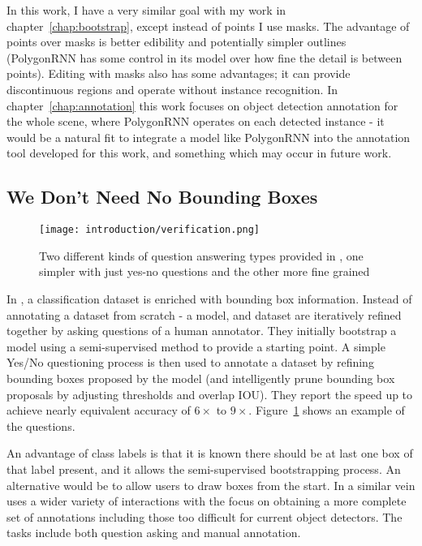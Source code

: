 In this work, I have a very similar goal with my work in chapter~\ref{chap:bootstrap}, except instead of points I use masks. The advantage of points over masks is better edibility and potentially simpler outlines (PolygonRNN has some control in its model over how fine the detail is between points). Editing with masks also has some advantages; it can provide discontinuous regions and operate without instance recognition. In chapter~\ref{chap:annotation} this work focuses on object detection annotation for the whole scene, where PolygonRNN operates on each detected instance - it would be a natural fit to integrate a model like PolygonRNN into the annotation tool developed for this work, and something which may occur in future work.


\subsection {We Don't Need No Bounding Boxes}

\begin{figure}[h]
  \centering
  \texttt{[image: introduction/verification.png]}
  \caption{Two different kinds of question answering types provided in \cite{Papadopoulos2016}, one simpler with just yes-no questions and the other more fine grained}
  \label{fig:verification}
\end{figure}

In \cite{Papadopoulos2016}, a classification dataset is enriched with bounding box information. Instead of annotating a dataset from scratch - a model, and dataset are iteratively refined together by asking questions of a human annotator. They initially bootstrap a model using a semi-supervised method  \cite{Cinbis2017} to provide a starting point. A simple Yes/No questioning process is then used to annotate a dataset by refining bounding boxes proposed by the model (and intelligently prune bounding box proposals by adjusting thresholds and overlap \gls{IOU}). They report the speed up to achieve nearly equivalent accuracy of $6\times$ to $9\times$.  Figure~\ref{fig:verification} shows an example of the questions.

An advantage of class labels is that it is known there should be at last one box of that label present, and it allows the semi-supervised bootstrapping process. An alternative would be to allow users to draw boxes from the start. In a similar vein \cite{Russakovsky2015a} uses a wider variety of interactions with the focus on obtaining a more complete set of annotations including those too difficult for current object detectors. The tasks include both question asking and manual annotation.


